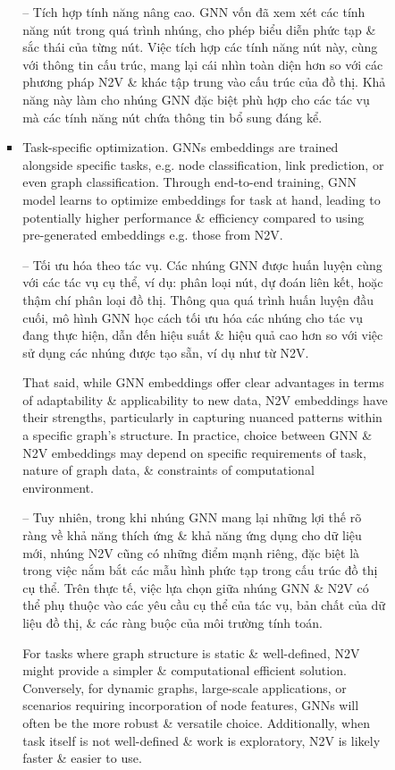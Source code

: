 \documentclass{article}
\begin{document}
\begin{itemize}
\begin{itemize}
\begin{itemize}
\begin{itemize}
               -- {\sf Tích hợp tính năng nâng cao.} GNN vốn đã xem xét các tính năng nút trong quá trình nhúng, cho phép biểu diễn phức tạp \& sắc thái của từng nút. Việc tích hợp các tính năng nút này, cùng với thông tin cấu trúc, mang lại cái nhìn toàn diện hơn so với các phương pháp N2V \& khác tập trung vào cấu trúc của đồ thị. Khả năng này làm cho nhúng GNN đặc biệt phù hợp cho các tác vụ mà các tính năng nút chứa thông tin bổ sung đáng kể.
               \item {\sf Task-specific optimization.} GNNs embeddings are trained alongside specific tasks, e.g. node classification, link prediction, or even graph classification. Through end-to-end training, GNN model learns to optimize embeddings for task at hand, leading to potentially higher performance \& efficiency compared to using pre-generated embeddings e.g. those from N2V.

               -- {\sf Tối ưu hóa theo tác vụ.} Các nhúng GNN được huấn luyện cùng với các tác vụ cụ thể, ví dụ: phân loại nút, dự đoán liên kết, hoặc thậm chí phân loại đồ thị. Thông qua quá trình huấn luyện đầu cuối, mô hình GNN học cách tối ưu hóa các nhúng cho tác vụ đang thực hiện, dẫn đến hiệu suất \& hiệu quả cao hơn so với việc sử dụng các nhúng được tạo sẵn, ví dụ như từ N2V.

               That said, while GNN embeddings offer clear advantages in terms of adaptability \& applicability to new data, N2V embeddings have their strengths, particularly in capturing nuanced patterns within a specific graph's structure. In practice, choice between GNN \& N2V embeddings may depend on specific requirements of task, nature of graph data, \& constraints of computational environment.

               -- Tuy nhiên, trong khi nhúng GNN mang lại những lợi thế rõ ràng về khả năng thích ứng \& khả năng ứng dụng cho dữ liệu mới, nhúng N2V cũng có những điểm mạnh riêng, đặc biệt là trong việc nắm bắt các mẫu hình phức tạp trong cấu trúc đồ thị cụ thể. Trên thực tế, việc lựa chọn giữa nhúng GNN \& N2V có thể phụ thuộc vào các yêu cầu cụ thể của tác vụ, bản chất của dữ liệu đồ thị, \& các ràng buộc của môi trường tính toán.

               For tasks where graph structure is static \& well-defined, N2V might provide a simpler \& computational efficient solution. Conversely, for dynamic graphs, large-scale applications, or scenarios requiring incorporation of node features, GNNs will often be the more robust \& versatile choice. Additionally, when task itself is not well-defined \& work is exploratory, N2V is likely faster \& easier to use.


\end{itemize}
\end{itemize}
\end{itemize}
\end{itemize}
\end{document}
